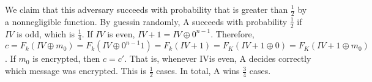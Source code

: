 \documentclass[onecolumn,oneside]{SUSTechHomework}
\begin{document}
  We claim that this adversary succeeds with probability that is greater than $\frac{1}{2}$ by a nonnegligible function. By guessin randomly, A succeeds with probability $\frac{1}{2}$ if $IV$ is odd, which is $\frac{1}{4}$. If $IV$ is even, $IV+1=IV \oplus 0^{n-1}$. Therefore, $c=F_k(IV \oplus m_0)=F_k(IV \oplus 0^{n-1}1)=F_k(IV+1)=F_K(IV+1 \oplus 0)=F_K(IV+1 \oplus m_0)$. If $m_0$ is encrypted, then $c=c'$. That is, whenever IVis even, A decides correctly which message was encrypted. This is $\frac{1}{2}$ cases. In total, A wins $\frac{3}{4}$ cases.
\end{document}
